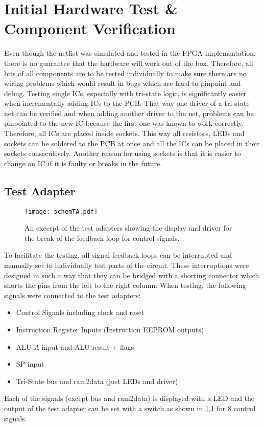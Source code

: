 \chapter{Initial Hardware Test \& Component Verification}\label{cha:eval}
Even though the netlist was simulated and tested in the \gls{FPGA} implementation, there is no guarantee that the hardware will work out of the box.
Therefore, all bits of all components are to be tested individually to make sure there are no wiring problems which would result in bugs which are hard to pinpoint and debug.
Testing single \glspl{IC}, especially with tri-state logic, is significantly easier when incrementally adding \glspl{IC} to the \gls{PCB}.
That way one driver of a tri-state net can be verified and when adding another driver to the net, problems can be pinpointed to the new \gls{IC} because the first one was known to work correctly.
Therefore, all \glspl{IC} are placed inside sockets.
This way all resistors, \glspl{LED} and sockets can be soldered to the \gls{PCB} at once and all the \glspl{IC} can be placed in their sockets consecutively.
Another reason for using sockets is that it is easier to change an \gls{IC} if it is faulty or breaks in the future.
\section{Test Adapter}\label{sec:testAdapter}
\begin{figure}[t]
  \centering
  \texttt{[image: schemTA.pdf]}
  \caption{An excerpt of the test adapters showing the display and driver for the break of the feedback loop for control signals.}
  \label{fig:schTA}
\end{figure}
To facilitate the testing, all signal feedback loops can be interrupted and manually set to individually test parts of the circuit.
These interruptions were designed in such a way that they can be bridged with a shorting connector which shorts the pins from the left to the right column.
When testing, the following signals were connected to the test adapters:
\begin{itemize}
  \item Control Signals including clock and reset
  \item Instruction Register Inputs (Instruction \gls{EEPROM} outputs)
  \item \gls{ALU} $A$ input and \gls{ALU} result + flags
  \item \gls{SP} input
  \item Tri-State bus and ram2data (just \glspl{LED} and driver)
\end{itemize}
Each of the signals (except bus and ram2data) is displayed with a \gls{LED} and the output of the test adapter can be set with a switch as shown in \cref{fig:schTA} for 8 control signals.

